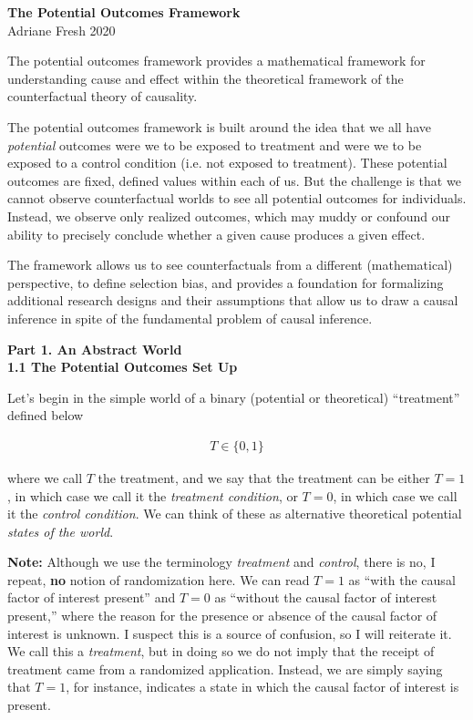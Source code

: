 \documentclass[11pt]{article}
\begin{document}
\normalsize
\singlespacing

\Large{\textbf{The Potential Outcomes Framework}}\\

\normalsize
Adriane Fresh
2020

\vspace{.2in}
The potential outcomes framework provides a mathematical framework for understanding cause and effect within the theoretical framework of the counterfactual theory of causality.

The potential outcomes framework is built around the idea that we all have \emph{potential} outcomes were we to be exposed to treatment and were we to be exposed to a control condition (i.e. not exposed to treatment).  These potential outcomes are fixed, defined values within each of us.  But the challenge is that we cannot observe counterfactual worlds to see all potential outcomes for individuals.  Instead, we observe only realized outcomes, which may muddy or confound our ability to precisely conclude whether a given cause produces a given effect.

The framework allows us to see counterfactuals from a different (mathematical) perspective, to define selection bias, and provides a foundation for formalizing additional research designs and their assumptions that allow us to draw a causal inference in spite of the fundamental problem of causal inference.

\vspace{.4in}
\large{\textbf{Part 1. An Abstract World}} \\


\large{\textbf{1.1 The Potential Outcomes Set Up}} \\

\normalsize

Let's begin in the simple world of a binary (potential or theoretical) ``treatment'' defined below

\begin{align*}
  T \in \{0, 1\}
\end{align*}

where we call $T$ the treatment, and we say that the treatment can be either $T=1$, in which case we call it the \emph{treatment condition}, or $T=0$, in which case we call it the \emph{control condition}.  We can think of these as alternative theoretical potential \emph{states of the world}.

\textbf{Note:} Although we use the terminology \emph{treatment} and \emph{control}, there is no, I repeat, \textbf{no} notion of randomization here.  We can read $T=1$ as ``with the causal factor of interest present'' and $T=0$ as ``without the causal factor of interest present,'' where the reason for the presence or absence of the causal factor of interest is unknown.   I suspect this is a source of confusion, so I will reiterate it.  We call this a \emph{treatment}, but in doing so we do not imply that the receipt of treatment came from a randomized application.  Instead, we are simply saying that $T=1$, for instance, indicates a state in which the causal factor of interest is present.
\end{document}
